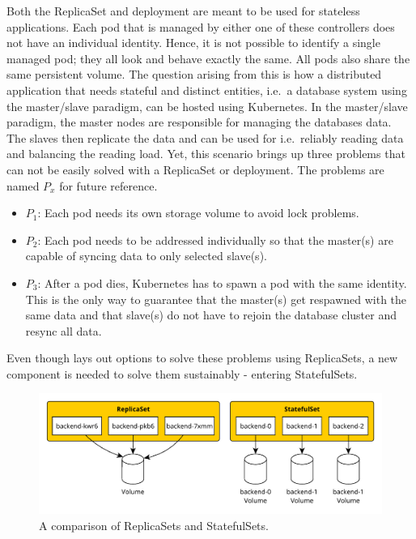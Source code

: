 
Both the ReplicaSet and deployment are meant to be used for stateless
applications. Each pod that is managed by either one of these controllers does
not have an individual identity. Hence, it is not possible to identify a single
managed pod; they all look and behave exactly the same. All pods also share the
same persistent volume. The question arising from this is how a distributed
application that needs stateful and distinct entities, i.e.\ a database system
using the master/slave paradigm, can be hosted using Kubernetes. In the
master/slave paradigm, the master nodes are responsible for managing the
databases data. The slaves then replicate the data and can be used for i.e.\
reliably reading data and balancing the reading load. Yet, this scenario brings
up three problems that can not be easily solved with a ReplicaSet or
deployment. The problems are named $P_x$ for future reference.

\begin{itemize}
  \item \textbf{$P_1$}: Each pod needs its own storage volume to avoid lock problems.
  \item \textbf{$P_2$}: Each pod needs to be addressed individually so that the master(s) are
    capable of syncing data to only selected slave(s).
  \item \textbf{$P_3$}: After a pod dies, Kubernetes has to spawn a pod with
    the same identity. This is the only way to guarantee that the master(s)
    get respawned with the same data and that slave(s) do not have to rejoin
    the database cluster and resync all data.
\end{itemize}

Even though \autocite[Ch. 10]{LuksaKubernetesAction2017} lays out options to
solve these problems using ReplicaSets, a new component is needed to solve them
sustainably - entering StatefulSets. 

\begin{figure}[H]
  \begin{center}
  \includegraphics[scale=0.7]{images/figures/statefulSets_vs_replicaSets.pdf}
\end{center}
\caption{A comparison of ReplicaSets and StatefulSets.}%
\label{fig:statefulSetsVSReplicaSets}
\end{figure}

